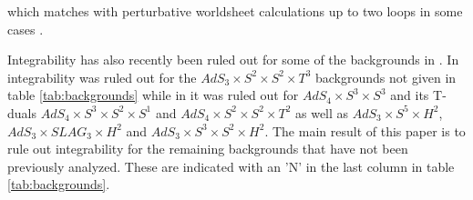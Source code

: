 \documentclass[a4paper,11pt]{article}
\begin{document}
\cite{Arutyunov:2004vx,Staudacher:2004tk,Beisert:2005fw,Beisert:2005tm,Janik:2006dc,Beisert:2006ib,Arutyunov:2006ak,Beisert:2006ez,Arutyunov:2006yd,Borsato:2012ud,Borsato:2012ss,Borsato:2013qpa,Borsato:2013hoa,Abbott:2013mpa,Borsato:2014hja,Lloyd:2014bsa,Abbott:2014pia,Borsato:2015mma,Borsato:2016xns} which matches with perturbative worldsheet calculations up to two loops in some cases \cite{Klose:2006zd,Klose:2007wq,Klose:2007rz,Puletti:2007hq,Zarembo:2009au,Kalousios:2009ey,Rughoonauth:2012qd,Sundin:2012gc,Sundin:2013ypa,Hoare:2013pma,Bianchi:2013nra,Hoare:2013ida,Engelund:2013fja,Sundin:2014sfa,Bianchi:2014rfa,Roiban:2014cia,Sundin:2014ema,Sundin:2015uva,Bianchi:2015iza,Bianchi:2015vgw,Sundin:2016gqe}.

Integrability has also recently been ruled out for some of the backgrounds in \cite{Wulff:2017zbl}. In \cite{Wulff:2017hzy} integrability was ruled out for the $AdS_3\times S^2\times S^2\times T^3$ backgrounds not given in table \ref{tab:backgrounds} while in \cite{Wulff:2017lxh} it was ruled out for $AdS_4\times S^3\times S^3$ and its T-duals $AdS_4\times S^3\times S^2\times S^1$ and $AdS_4\times S^2\times S^2\times T^2$ as well as $AdS_3\times S^5\times H^2$, $AdS_3\times SLAG_3\times H^2$ and $AdS_3\times S^3\times S^2\times H^2$. The main result of this paper is to rule out integrability for the remaining backgrounds that have not been previously analyzed. These are indicated with an 'N' in the last column in table \ref{tab:backgrounds}.
\end{document}
